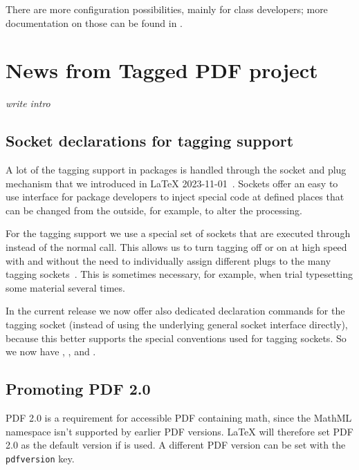 \documentclass{ltnews}
\begin{document}
There are more configuration possibilities, mainly for class
developers; more documentation on those can be found in
\cite[\S54 ltoutput.dtx]{41:source2e}.



\section{News from Tagged PDF project}

\emph{write intro}


\subsection{Socket declarations for tagging  support}

A lot of the tagging support in packages is handled through the socket
and plug mechanism that we introduced in \LaTeX{}
2023-11-01~\cite{41:ltnews38}. Sockets offer an easy to use interface
for package developers to inject special code at defined places that
can be changed from the outside, for example, to alter the processing.

For the tagging support we use a special set of sockets that are
executed through  instead of the normal
 call. This allows us to turn tagging off or on at high
speed with  and  without the need
to individually assign different plugs to the many tagging
sockets~\cite{41:ltnews39}. This is sometimes necessary, for example,
when trial typesetting some material several times.

In the current release we now offer also dedicated declaration
commands for the tagging socket (instead of using the underlying
general socket interface directly), because this better supports the
special conventions used for tagging sockets. So we now have
, , and
.


\subsection{Promoting PDF 2.0}

PDF 2.0 is a requirement for accessible PDF containing math, since the
MathML namespace isn't supported by earlier PDF versions. \LaTeX{}
will therefore set PDF 2.0 as the default version if
 is used. A different PDF version can be set with
the \texttt{pdfversion} key.
\end{document}
